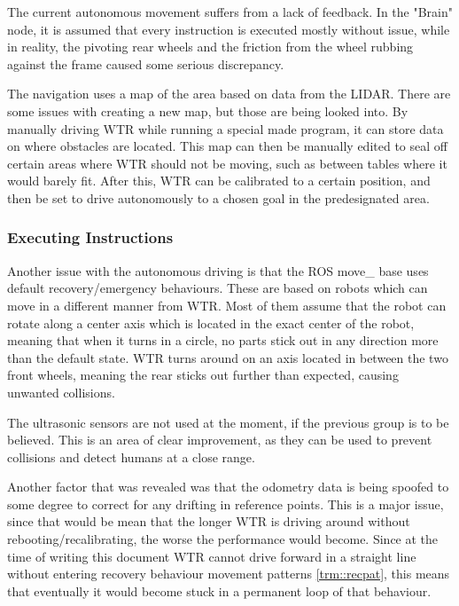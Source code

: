 The current autonomous movement suffers from a lack of feedback.
In the "Brain" node, it is assumed that every instruction is executed mostly without issue, while in reality, the pivoting rear wheels and the friction from the wheel rubbing against the frame caused some serious discrepancy.


The navigation uses a map of the area based on data from the LIDAR.
There are some issues with creating a new map, but those are being looked into.
By manually driving WTR while running a special made program, it can store data on where obstacles are located.
This map can then be manually edited to seal off certain areas where WTR should not be moving, such as between tables where it would barely fit.
After this, WTR can be calibrated to a certain position, and then be set to drive autonomously to a chosen goal in the predesignated area.

\subsubsection{Executing Instructions}
Another issue with the autonomous driving is that the ROS move\_ base uses default recovery/emergency behaviours.
These are based on robots which can move in a different manner from WTR.
Most of them assume that the robot can rotate along a center axis which is located in the exact center of the robot, meaning that when it turns in a circle, no parts stick out in any direction more than the default state.
WTR turns around on an axis located in between the two front wheels, meaning the rear sticks out further than expected, causing unwanted collisions.

The ultrasonic sensors are not used at the moment, if the previous group is to be believed.
This is an area of clear improvement, as they can be used to prevent collisions and detect humans at a close range.

Another factor that was revealed was that the odometry data is being spoofed to some degree to correct for any drifting in reference points.
This is a major issue, since that would be mean that the longer WTR is driving around without rebooting/recalibrating, the worse the performance would become.
Since at the time of writing this document WTR cannot drive forward in a straight line without entering recovery behaviour movement patterns \ref{trm::recpat}, this means that eventually it would become stuck in a permanent loop of that behaviour.



\newpage
